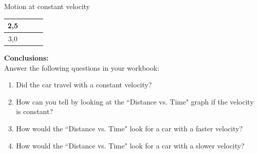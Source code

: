 \begin{g_experiment}{Motion at constant velocity }
\begin{center}
\begin{tabular}{|c|p{0.5cm}|p{0.5cm}|p{0.5cm}|}
2,5&&&\\\hline
3,0&&&\\\hline
\end{tabular}
\end{center}
    \par
        \label{m38795*id71722}\noindent{}\textbf{Conclusions:}\\
Answer the following questions in your workbook:
        \label{m38795*id71746}\begin{enumerate}[noitemsep, label=\textbf{\arabic*}. ] 
            \label{m38795*uid108}\item Did the car travel with a constant velocity?
\label{m38795*uid109}\item How can you tell by looking at the ``Distance vs. Time" graph if the velocity is constant?
\label{m38795*uid110}\item How would the ``Distance vs. Time" look for a car with a faster velocity?
\label{m38795*uid111}\item How would the ``Distance vs. Time" look for a car with a slower velocity?
\end{enumerate}
\end{g_experiment}
        \par 
      \label{m38795*uid112}
